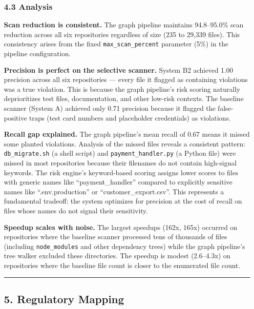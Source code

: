\documentclass[
]{article}
\begin{document}
\subsubsection{4.3 Analysis}\label{analysis}

\textbf{Scan reduction is consistent.} The graph pipeline maintains
94.8--95.0\% scan reduction across all six repositories regardless of
size (235 to 29,339 files). This consistency arises from the fixed
\texttt{max\_scan\_percent} parameter (5\%) in the pipeline
configuration.

\textbf{Precision is perfect on the selective scanner.} System B2
achieved 1.00 precision across all six repositories --- every file it
flagged as containing violations was a true violation. This is because
the graph pipeline's risk scoring naturally deprioritizes test files,
documentation, and other low-risk contexts. The baseline scanner (System
A) achieved only 0.71 precision because it flagged the false-positive
traps (test card numbers and placeholder credentials) as violations.

\textbf{Recall gap explained.} The graph pipeline's mean recall of 0.67
means it missed some planted violations. Analysis of the missed files
reveals a consistent pattern: \texttt{db\_migrate.sh} (a shell script)
and \texttt{payment\_handler.py} (a Python file) were missed in most
repositories because their filenames do not contain high-signal
keywords. The risk engine's keyword-based scoring assigns lower scores
to files with generic names like ``payment\_handler'' compared to
explicitly sensitive names like ``.env.production'' or
``customer\_export.csv''. This represents a fundamental tradeoff: the
system optimizes for precision at the cost of recall on files whose
names do not signal their sensitivity.

\textbf{Speedup scales with noise.} The largest speedups (162x, 165x)
occurred on repositories where the baseline scanner processed tens of
thousands of files (including \texttt{node\_modules} and other
dependency trees) while the graph pipeline's tree walker excluded these
directories. The speedup is modest (2.6--4.3x) on repositories where the
baseline file count is closer to the enumerated file count.

\begin{center}\rule{0.5\linewidth}{0.5pt}\end{center}

\subsection{5. Regulatory Mapping}\label{regulatory-mapping}
\end{document}
